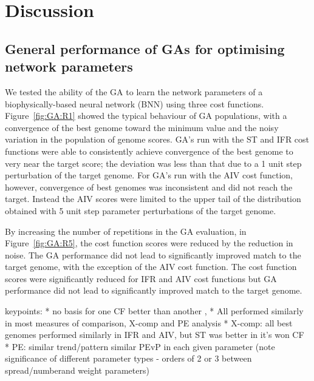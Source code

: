 



\section{Discussion}\label{sec:GA:discussion}

\subsection{General performance of GAs for optimising network parameters}\label{sec:GA:general-perf}

We tested the ability of the GA to learn the network parameters of a
biophysically-based neural network (BNN) using three cost
functions. Figure~\ref{fig:GA:R1} showed the typical behaviour of GA populations,
with a convergence of the best genome toward the minimum value and the noisy
variation in the population of genome scores. GA's run with the ST and IFR cost
functions were able to consistently achieve convergence of the best genome to
very near the target score; the deviation was less than that due to a 1 unit
step perturbation of the target genome. For GA's run with the AIV cost function,
however, convergence of best genomes was inconsistent and did not reach the
target. Instead the AIV scores were limited to the upper tail of the
distribution obtained with 5 unit step parameter perturbations of the target
genome.

\smallskip{}

By increasing the number of repetitions in the GA evaluation, in
Figure~\ref{fig:GA:R5}, the cost function scores were reduced by the reduction in
noise. The GA performance did not lead to significantly improved match to the
target genome, with the exception of the AIV cost function.  The cost function
scores were significantly reduced for IFR and AIV cost functions but GA
performance did not lead to significantly improved match to the target genome.


\smallskip{}

keypoints:
* no basis for one CF better than another , 
* All performed similarly in most measures of comparison, X-comp and PE analysis
* X-comp: all best genomes performed similarly in IFR and AIV, but ST was better in it's won CF
* PE: similar trend/pattern similar PEvP in each given parameter (note significance of different parameter types - orders of 2 or 3 between spread/numberand weight parameters)

